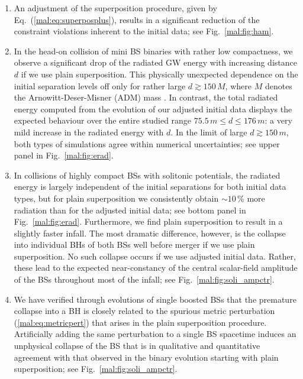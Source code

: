 \begin{enumerate}
  \item An adjustment of the superposition procedure, given 
  by Eq.~(\ref{mal:eq:superposplus}), results in a significant
  reduction of the constraint violations inherent to the initial data;
  see Fig.~\ref{mal:fig:ham}.
  \item In the head-on collision of mini BS binaries with rather low compactness,
  we observe a significant drop of the radiated GW energy with increasing
  distance $d$ if we use plain superposition. This physically unexpected dependence
  on the initial separation levels off only for rather large 
  $d\gtrsim 150\,M$,
  where $M$ denotes the Arnowitt-Deser-Misner (ADM) mass
  \cite{Arnowitt:1962hi}. In contrast, the total radiated energy computed from
  the evolution of our adjusted initial data displays the expected
  behaviour over the entire studied range $75.5\,m\le d\le 176\,m$:
  a very mild increase in the radiated energy with $d$. In the limit of large
  $d \gtrsim 150\,m$, both types of simulations agree within numerical uncertainties;
  see upper panel in Fig.~\ref{mal:fig:erad}.
  \item In collisions of highly compact BSs with solitonic potentials,
  the radiated energy is largely independent of the initial separations
  for both initial data types, but for plain superposition we consistently
  obtain $\sim 10\,\%$ more radiation than for the adjusted initial data;
  see bottom panel in Fig.~\ref{mal:fig:erad}. Furthermore,
  we find plain superposition to result in a slightly faster infall.
  The most dramatic difference, however, is the collapse into individual BHs
  of both BSs well before merger if we use plain superposition. No such collapse
  occurs if we use adjusted initial data. Rather,
  these lead to the expected near-constancy of the central scalar-field amplitude
  of the BSs throughout most of the infall; see Fig.~\ref{mal:fig:soli_ampctr}.
  \item We have verified through evolutions of single boosted BSs that the
  premature collapse into a BH is closely related to the spurious metric
  perturbation (\ref{mal:eq:metricpert}) that arises in the plain superposition
  procedure. Artificially adding the same perturbation to a single BS
  spacetime induces an unphysical collapse of the BS that is in
  qualitative and quantitative agreement with that observed in
  the binary evolution starting with plain superposition;
  see Fig.~\ref{mal:fig:soli_ampctr}.
\end{enumerate}




